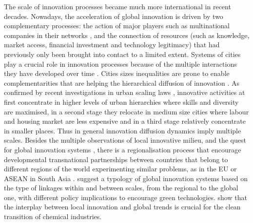 \documentclass[letterpaper]{article}
\begin{document}
The scale of innovation processes became much more international in recent decades. Nowadays, the acceleration of global innovation is driven by two complementary processes: the action of major players such as multinational companies in their networks \citep{rozenblat2007firm}, and the connection of resources (such as knowledge, market access, financial investment and technology legitimacy) that had previously only been brought into contact to a limited extent. Systems of cities play a crucial role in innovation processes because of the multiple interactions they have developed over time \citep{scott2015nature}. Cities sizes inequalities are prone to enable complementarities that are helping the hierarchical diffusion of innovation \citep{hagerstrand1968innovation}. As confirmed by recent investigations in urban scaling laws \citep{pumain2006evolutionary}, innovative activities at first concentrate in higher levels of urban hierarchies where skills and diversity are maximised, in a second stage they relocate in medium size cities where labour and housing market are less expensive and in a third stage relatively concentrate in smaller places. Thus in general innovation diffusion dynamics imply multiple scales. Besides the multiple observations of local innovative milieu, and the quest for global innovation systems \citep{binz2017global}, there is a regionalisation process that encourage developmental transnational partnerships between countries that belong to different regions of the world experimenting similar problems, as in the EU \citep{palle2022multilevel} or ASEAN in South Asia \citep{krapohl2017regional}. \cite{binz2017global} suggest a typology of global innovation systems based on the type of linkages within and between scales, from the regional to the global one, with different policy implications to encourage green technologies. \cite{bauer2019local} show that the interplay between local innovation and global trends is crucial for the clean transition of chemical industries.
\end{document}

